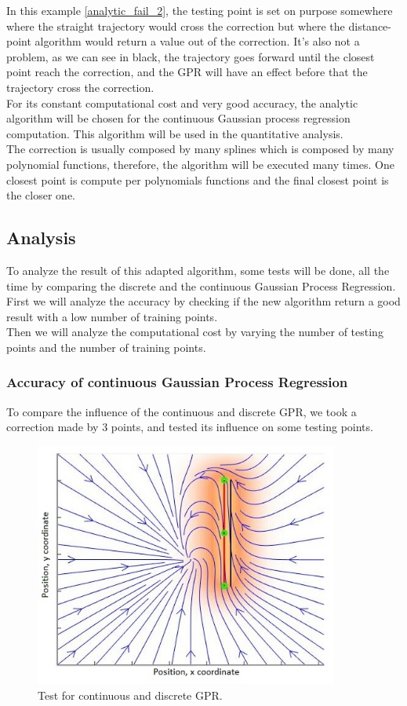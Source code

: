 In this example \autoref{analytic_fail_2}, the testing point is set on purpose somewhere where the straight trajectory would cross the correction but where the distance-point algorithm would return a value out of the correction. It's also not a problem, as we can see in black, the trajectory goes forward until the closest point reach the correction, and the GPR will have an effect before that the trajectory cross the correction.\\

For its constant computational cost and very good accuracy, the analytic algorithm will be chosen for the continuous Gaussian process regression computation. This algorithm will be used in the quantitative analysis.\\

The correction is usually composed by many splines which is composed by many polynomial functions, therefore, the algorithm will be executed many times. One closest point is compute per polynomials functions and the final closest point is the closer one.

\clearpage
\subsection{Analysis}

To analyze the result of this adapted algorithm, some tests will be done, all the time by comparing the discrete and the continuous Gaussian Process Regression. \\
First we will analyze the accuracy by checking if the new algorithm return a good result with a low number of training points.\\
Then we will analyze the computational cost by varying the number of testing points and the number of training points.

\subsubsection{Accuracy of continuous Gaussian Process Regression}

To compare the influence of the continuous and discrete GPR, we took a correction made by 3 points, and tested its influence on some testing points.

\begin{figure}[H]
\centering
\includegraphics[width=10cm]{img/gp_test.jpg}
\caption{Test for continuous and discrete GPR.}
\label{quan_gpr_1}
\end{figure}

